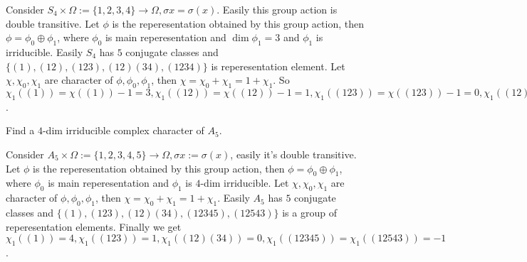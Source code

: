 \documentclass{ctexart}
\begin{document}
\begin{solution}
  Consider \(S_4 \times \Omega:=\{ 1,2,3,4\} \to \Omega,\sigma x=\sigma( x)\). Easily this group action is double transitive. 
  Let \(\phi\) is the reperesentation obtained by this group action, then \(\phi=\phi_0 \oplus \phi_1\), where \(\phi_0\) is main reperesentation and \(\dim \phi_1=3\) and \(\phi_1\) is irriducible. 
  Easily \(S_4\) has \(5\) conjugate classes and \(\{ ( 1),( 12),( 123),( 12)( 34),( 1234)\}\) is reperesentation element. 
  Let \(\chi,\chi_0,\chi_1\) are character of \(\phi,\phi_0,\phi_1\), then \(\chi=\chi_0+\chi_1=1+\chi_1\). 
  So \(\chi_1( ( 1))=\chi( ( 1))-1=3,\chi_1( ( 12))=\chi( ( 12))-1=1,\chi_1( ( 123))=\chi(( 123))-1=0,\chi_1( ( 12)( 34))=\chi( ( 12)( 34))-1=-1,\chi_1( ( 1234))=\chi( ( 1234))-1=-1\). 
\end{solution}

\begin{problem}
  Find a \(4\)-dim irriducible complex character of \(A_5\).
\end{problem}

\begin{solution}
  Consider \(A_5 \times \Omega:=\{ 1,2,3,4,5\} \to \Omega,\sigma x:=\sigma( x)\), easily it's double transitive. 
  Let \(\phi\) is the reperesentation obtained by this group action, then \(\phi=\phi_0 \oplus \phi_1\), where \(\phi_0\) is main reperesentation and \(\phi_1\) is \(4\)-dim irriducible. 
  Let \(\chi,\chi_0,\chi_1\) are character of \(\phi,\phi_0,\phi_1\), then \(\chi=\chi_0+\chi_1=1+\chi_1\). 
  Easily \(A_5\) has \(5\) conjugate classes and \(\{ ( 1),( 123),( 12)( 34),( 12345),( 12543)\}\) is a group of reperesentation elements. 
  Finally we get \(\chi_1( ( 1))=4,\chi_1( ( 123))=1,\chi_1( ( 12)( 34))=0,\chi_1( ( 12345))=\chi_1( ( 12543))=-1\).
\end{solution}
\end{document}
